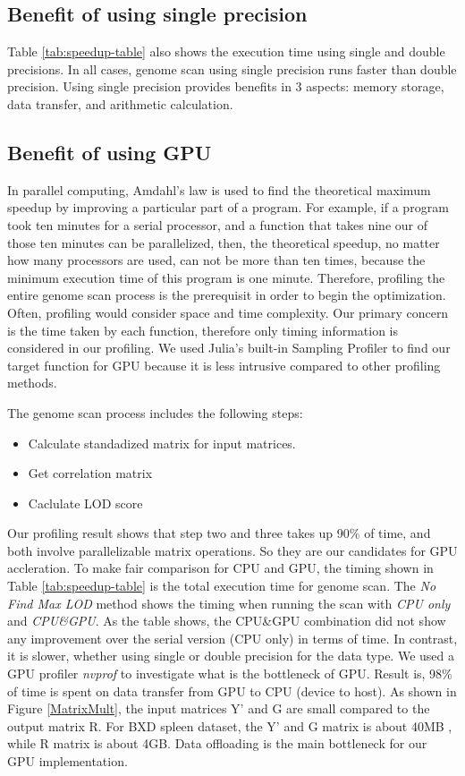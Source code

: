 \documentclass[9pt,twocolumn,twoside,lineno]{gsag3jnl}
\begin{document}
\subsection{Benefit of using single precision}
Table \ref{tab:speedup-table} also shows the execution time using single and double precisions. 
In all cases, genome scan using single precision runs faster than double precision. 
Using single precision provides benefits in 3 aspects: memory storage, data transfer, and arithmetic calculation. 

\subsection{Benefit of using GPU}
In parallel computing, Amdahl's law is used to find the theoretical maximum speedup by improving a particular part of a program.  
For example, if a program took ten minutes for a serial processor, and a function that takes nine our of those ten minutes can be parallelized, then, the theoretical speedup, no matter how many processors are used, can not be more than ten times, because the minimum execution time of this program is one minute. 
Therefore, profiling the entire genome scan process is the prerequisit in order to begin the optimization. 
Often, profiling would consider space and time complexity. 
Our primary concern is the time taken by each function, therefore only timing information is considered in our profiling. 
We used Julia's built-in Sampling Profiler %
to find our target function for GPU because it is less intrusive compared to other profiling methods. 

The genome scan process includes the following steps:
\begin{itemize}
	\item Calculate standadized matrix for input matrices.
	\item Get correlation matrix
	\item Caclulate LOD score
\end{itemize}
Our profiling result shows that step two and three takes up 90\% of time, and both involve parallelizable matrix operations. 
So they are our candidates for GPU accleration.
To make fair comparison for CPU and GPU, the timing shown in Table \ref{tab:speedup-table} is the total execution time for genome scan. 
The \textit{No Find Max LOD} method shows the timing when running the scan with \textit{CPU only} and \textit{CPU\&GPU}.
As the table shows, the CPU\&GPU combination did not show any improvement over the serial version (CPU only) in terms of time. 
In contrast, it is slower, whether using single or double precision for the data type.
We used a GPU profiler \textit{nvprof} %
to investigate what is the bottleneck of GPU. 
Result is, 98\% of time is spent on data transfer from GPU to CPU (device to host).
As shown in Figure \ref{MatrixMult}, the input matrices Y' and G are small compared to the output matrix R.
For BXD spleen dataset, the Y' and G matrix is about 40MB %
, while R matrix is about 4GB.
Data offloading is the main bottleneck for our GPU implementation. 
\end{document}
